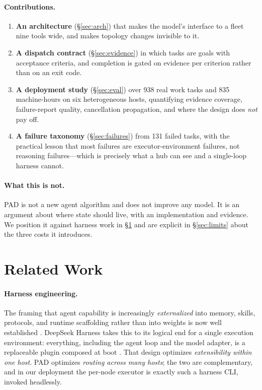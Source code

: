 \documentclass{article}
\begin{document}
\paragraph{Contributions.}
\begin{enumerate}[leftmargin=1.4em,itemsep=2pt,topsep=3pt]
  \item \textbf{An architecture} (\S\ref{sec:arch}) that makes the model's interface
        to a fleet nine tools wide, and makes topology changes invisible to it.
  \item \textbf{A dispatch contract} (\S\ref{sec:evidence}) in which tasks are goals
        with acceptance criteria, and completion is gated on evidence per criterion
        rather than on an exit code.
  \item \textbf{A deployment study} (\S\ref{sec:eval}) over 938 real work tasks and
        835 machine-hours on six heterogeneous hosts, quantifying evidence coverage,
        failure-report quality, cancellation propagation, and where the design does
        \emph{not} pay off.
  \item \textbf{A failure taxonomy} (\S\ref{sec:failures}) from 131 failed tasks,
        with the practical lesson that most failures are executor-environment
        failures, not reasoning failures---which is precisely what a hub can see and
        a single-loop harness cannot.
\end{enumerate}

\paragraph{What this is not.} PAD is not a new agent algorithm and does not improve
any model. It is an argument about where state should live, with an implementation
and evidence. We position it against harness work in \S\ref{sec:related} and are
explicit in \S\ref{sec:limits} about the three costs it introduces.

\section{Related Work}
\label{sec:related}

\paragraph{Harness engineering.} The framing that agent capability is increasingly
\emph{externalized} into memory, skills, protocols, and runtime scaffolding rather
than into weights is now well established \cite{externalization2026}. DeepSeek
Harness takes this to its logical end for a single execution environment: everything,
including the agent loop and the model adapter, is a replaceable plugin composed at
boot \cite{deepseekharness2026,cordis2026}. That design optimizes \emph{extensibility
within one host}. PAD optimizes \emph{routing across many hosts}; the two are
complementary, and in our deployment the per-node executor is exactly such a harness
CLI, invoked headlessly.
\end{document}
